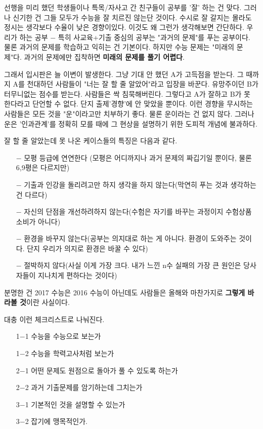 \vspace{5mm}

선행을 미리 했던 학생들이나 특목/자사고 간 친구들이 공부를 '잘' 하는 건 맞다.
그러나 신기한 건 그들 모두가 수능을 잘 치르진 않는단 것이다. 수시로 잘 갈지는 몰라도 정시는 생각보다 수율이 낮은 경향이있다.
이것도 왜 그런가 생각해보면 간단하다.
우리가 하는 공부 $-$ 특히 사교육+기출 중심의 공부는 "과거의 문제"를 푸는 공부이다.
물론 과거의 문제를 학습하고 익히는 건 기본이다. 하지만 수능 문제는 "미래의 문제"다.
과거의 문제에만 집착하면 \textbf{미래의 문제를 풀기 어렵다}.
\vspace{5mm}

그래서 입시판은 늘 이변이 발생한다.
그냥 기대 안 했던 A가 고득점을 받는다. 그 때까지 A를 천대하던 사람들이 "너는 잘 할 줄 알았어"라고 입장을 바꾼다.
유망주이던 B가 터무니없는 점수를 받는다. 사람들은 싹 침묵해버린다.
그렇다고 A가 잘하고 B가 못 한다라고 단언할 수 없다. 단지 출제'경향'에 안 맞았을 뿐이다.
이런 경향을 무시하는 사람들은 모든 것을 "운"이라고만 치부하기 좋다.
물론 운이라는 건 없지 않다. 그러나 운은 '인과관계'를 정확히 모를 때에 그 현상을 설명하기 위한 도피적 개념에 불과하다.
\vspace{5mm}

잘 할 줄 알았는데 못 나온 케이스들의 특징은 다음과 같다.
\vspace{5mm}

\begin{itemize}
    \item[$-$] 모평 등급에 연연한다 (모평은 어디까지나 과거 문제의 짜깁기일 뿐이다, 물론 6,9평은 다르지만)
    \item[$-$] 기출과 인강을 돌리려고만 하지 생각을 하지 않는다(막연히 푸는 것과 생각하는 건 다르다)
    \item[$-$] 자신의 단점을 개선하려하지  않는다(수험은 자기를 바꾸는 과정이지 수험상품 소비가 아니다)
    \item[$-$] 환경을 바꾸지 않는다(공부는 의지대로 하는 게 아니다. 환경이 도와주는 것이다. 단지 우리가 의지로 환경은 바꿀 수 있다)
    \item[$-$] 절박하지 않다(사실 이게 가장 크다. 내가 느낀 n수 실패의 가장 큰 원인은 당사자들이 지나치게 편하다는 것이다)
\end{itemize}
\vspace{5mm}

분명한 건 2017 수능은 2016 수능이 아닌데도 사람들은 올해와 마찬가지로 \textbf{그렇게 바라볼 것}이란 사실이다.
\vspace{5mm}

대충 이런 체크리스트로 나눠진다.
\vspace{5mm}
\begin{itemize}
    \item[] 1$-$1 수능을 수능으로 보는가 
    \item[] 1$-$2 수능을 학력고사처럼 보는가
    \item[] 2$-$1 어떤 문제도 원점으로 돌아가 풀 수 있도록 하는가  
    \item[] 2$-$2 과거 기출문제를 암기하는데 그치는가
    \item[] 3$-$1 기본적인 것을 설명할 수 있는가 
    \item[] 3$-$2 잡기에 맹목적인가.
\end{itemize}
\vspace{5mm}

